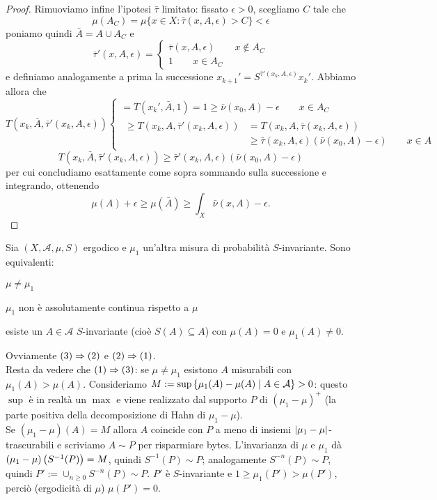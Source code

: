 \begin{proof}
Rimuoviamo infine l'ipotesi $\bar\tau$ limitato: fissato $\epsilon>0$, scegliamo $C$ tale che
\[\mu(A_C)=\mu\{x\in X: \bar\tau(x,A,\epsilon)>C\}<\epsilon\]
poniamo quindi $\bar A=A\cup A_C$ e
\[\bar\tau'(x,A,\epsilon)=\begin{cases}\bar\tau(x,A,\epsilon) \qquad x\notin A_C\\
					1 \qquad x\in A_C
  \end{cases}\]
e definiamo analogamente a prima la successione $x_{k+1}'=S^{\bar\tau'(x_k,A,\epsilon)}x_k'$. Abbiamo allora che
\[T(x_k,\bar A,\bar\tau'(x_k,A,\epsilon))
    \begin{cases} =T(x_k',\bar A,1)=1\geq \bar\nu(x_0,A)-\epsilon \qquad x\in A_C \\
		  \begin{split}\geq T(x_k,A,\bar\tau'(x_k,A,\epsilon))&=T(x_k,A,\bar\tau(x_k,A,\epsilon))\\
			&\geq \bar\tau(x_k,A,\epsilon)(\bar\nu(x_0,A)-\epsilon) \qquad x\in A \end{split}
    \end{cases}\]
\[T(x_k,\bar A,\bar\tau'(x_k,A,\epsilon))\geq \bar\tau'(x_k,A,\epsilon)(\bar\nu(x_0,A)-\epsilon)\]
per cui concludiamo esattamente come sopra sommando sulla successione e integrando, ottenendo
\[\mu(A)+\epsilon\geq\mu(\bar A)\geq \int_X \bar\nu(x,A)-\epsilon.\]
\end{proof}


\begin{esercizio}Sia $(X,\mathcal{A},\mu,S)$ ergodico e $\mu_1$ un'altra misura di probabilità $S$-invariante.
Sono equivalenti:
\begin{lista}
\item $\mu\neq\mu_1$
\item $\mu_1$ non è assolutamente continua rispetto a $\mu$
\item esiste un $A\in\mathcal{A}$ $S$-invariante (cioè $S(A)\subseteq A$) con $\mu(A)=0$ e $\mu_1(A)\neq 0$.
\end{lista}
\end{esercizio}

\begin{soluz}Ovviamente $(3)\Rightarrow (2)$ e $(2)\Rightarrow (1)$. \\
Resta da vedere che $(1)\Rightarrow (3)$: se $\mu\neq\mu_1$ esistono $A$ misurabili con $\mu_1(A)>\mu(A)$.
Consideriamo $M:=\sup\left\{\mu_1(A)-\mu(A)\mid A\in\mathcal{A}\right\}>0$: questo $\sup$ è in realtà un $\max$
e viene realizzato dal supporto $P$ di $(\mu_1-\mu)^+$ (la parte positiva della decomposizione di Hahn di $\mu_1-\mu$). \\
Se $(\mu_1-\mu)(A)=M$ allora $A$ coincide con $P$ a meno di insiemi $\left|\mu_1-\mu\right|$-trascurabili e scriviamo
$A\sim P$ per risparmiare bytes.
L'invarianza di $\mu$ e $\mu_1$ dà $(\mu_1-\mu)\left(S^{-1}(P)\right)=M$, quindi $S^{-1}(P)\sim P$; analogamente $S^{-n}(P)\sim P$,
quindi $P':=\cup_{n\ge 0}S^{-n}(P)\sim P$. $P'$ è $S$-invariante e $1\ge \mu_1(P')>\mu(P')$, perciò
(ergodicità di $\mu$) $\mu(P')=0$.
\end{soluz}

